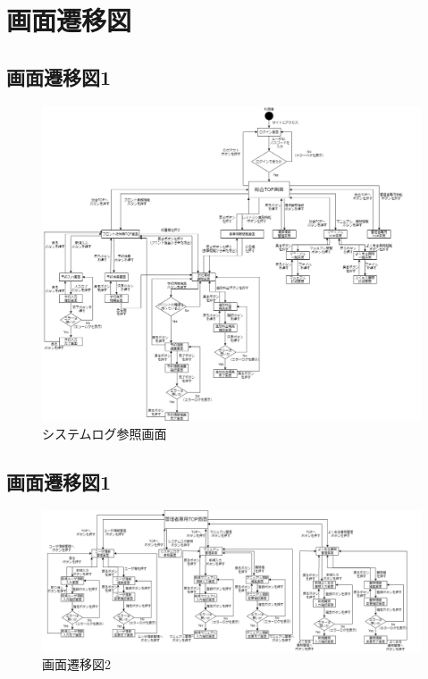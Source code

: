 
\section{画面遷移図}
\subsection{画面遷移図1}
\begin{figure}[H]
 \centering
   \includegraphics[width=150mm]{UI-umino/gamen1.png}
 \caption{システムログ参照画面}
 \label{fig:gamen1}
\end{figure}
\subsection{画面遷移図1}
\begin{figure}[H]
 \centering
   \includegraphics[width=150mm]{UI-umino/gamen2.png}
 \caption{画面遷移図2}
 \label{fig:gamen2}
\end{figure}
